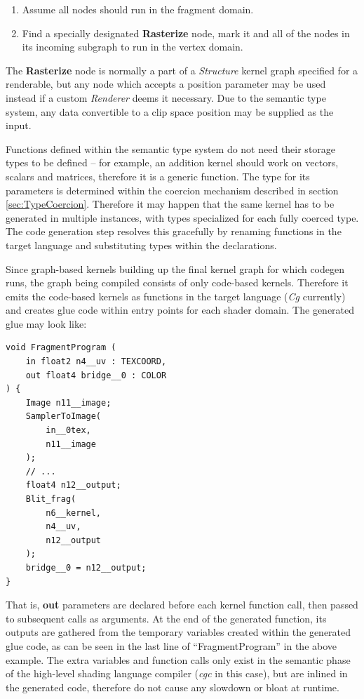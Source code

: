 \begin{enumerate}
\item Assume all nodes should run in the fragment domain.
\item Find a specially designated \textbf{Rasterize} node, mark it and all of the nodes in its incoming subgraph to run in the vertex domain.
\end{enumerate}

The \textbf{Rasterize} node is normally a part of a \emph{Structure} kernel graph specified for a renderable, but any node which accepts a position parameter may be used instead if a custom \emph{Renderer} deems it necessary. Due to the semantic type system, any data convertible to a clip space position may be supplied as the input.

Functions defined within the semantic type system do not need their storage types to be defined -- for example, an addition kernel should work on vectors, scalars and matrices, therefore it is a generic function. The type for its parameters is determined within the coercion mechanism described in section \ref{sec:TypeCoercion}. Therefore it may happen that the same kernel has to be generated in multiple instances, with types specialized for each fully coerced type. The code generation step resolves this gracefully by renaming functions in the target language and substituting types within the declarations.

Since graph-based kernels building up the final kernel graph for which codegen runs, the graph being compiled consists of only code-based kernels. Therefore it emits the code-based kernels as functions in the target language (\emph{Cg} currently) and creates glue code within entry points for each shader domain. The generated glue may look like:
\begin{lstlisting}[frame=single]
void FragmentProgram (
	in float2 n4__uv : TEXCOORD,
	out float4 bridge__0 : COLOR
) {
	Image n11__image;
	SamplerToImage(
		in__0tex,
		n11__image
	);
	// ...
	float4 n12__output;
	Blit_frag(
		n6__kernel,
		n4__uv,
		n12__output
	);
	bridge__0 = n12__output;
}
\end{lstlisting}
That is, \textbf{out} parameters are declared before each kernel function call, then passed to subsequent calls as arguments. At the end of the generated function, its outputs are gathered from the temporary variables created within the generated glue code, as can be seen in the last line of ``FragmentProgram'' in the above example. The extra variables and function calls only exist in the semantic phase of the high-level shading language compiler (\emph{cgc} in this case), but are inlined in the generated code, therefore do not cause any slowdown or bloat at runtime.


